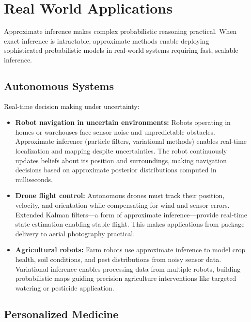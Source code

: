 
\section{Real World Applications}
\label{sec:approx-inference-real-world}


Approximate inference makes complex probabilistic reasoning practical. When exact inference is intractable, approximate methods enable deploying sophisticated probabilistic models in real-world systems requiring fast, scalable inference.

\subsection{Autonomous Systems}

Real-time decision making under uncertainty:

\begin{itemize}
    \item \textbf{Robot navigation in uncertain environments:} Robots operating in homes or warehouses face sensor noise and unpredictable obstacles. Approximate inference (particle filters, variational methods) enables real-time localization and mapping despite uncertainties. The robot continuously updates beliefs about its position and surroundings, making navigation decisions based on approximate posterior distributions computed in milliseconds.
    
    \item \textbf{Drone flight control:} Autonomous drones must track their position, velocity, and orientation while compensating for wind and sensor errors. Extended Kalman filters—a form of approximate inference—provide real-time state estimation enabling stable flight. This makes applications from package delivery to aerial photography practical.
    
    \item \textbf{Agricultural robots:} Farm robots use approximate inference to model crop health, soil conditions, and pest distributions from noisy sensor data. Variational inference enables processing data from multiple robots, building probabilistic maps guiding precision agriculture interventions like targeted watering or pesticide application.
\end{itemize}

\subsection{Personalized Medicine}

